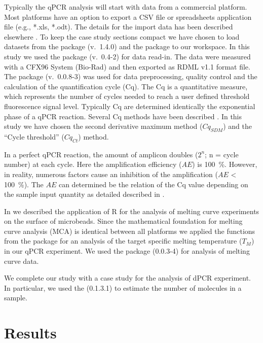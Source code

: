 Typically the qPCR analysis will start with data from a commercial platform. 
Most platforms have an option to export a CSV file or spreadsheets application 
file (e.g., *.xls, *.odt). The details for the import data has been described 
elsewhere \citep{RDCT2010c, rodiger_rkward_2012}. To keep the case study 
sections compact we have chosen to load datasets from the  package 
\citep{ritz_2008, spiess_2008} (v.~1.4.0) and the  package to our 
workspace. In this study we used the  package (v.~0.4-2) for data 
read-in. The data were measured with a CFX96 System (Bio-Rad) and then exported 
as RDML v1.1 format file. The  package (v.~0.0.8-3) was used 
for data preprocessing, quality control and  the calculation of the 
quantification cycle (Cq). The Cq is a quantitative measure, which represents 
the number of cycles needed to reach a user defined threshold fluorescence 
signal level. Typically Cq are determined identically the exponential phase of a 
qPCR reaction. Several Cq methods have been described \citep{ruijter_2013}. In 
this study we have chosen the second derivative maximum method ($Cq_{SDM}$) and 
the ``Cycle threshold'' ($Cq_{Ct}$) method.

In a perfect qPCR reaction, the amount of amplicon doubles ($2^{n}$; n = cycle 
number) at each cycle. Here the amplification efficiency ($AE$) is 100~\%. 
However, in reality, numerous factors cause an inhibition of the amplification 
($AE$ < 100~\%).  The $AE$ can determined be the relation of the Cq value 
depending on the sample input quantity as detailed described in 
\citep{roediger_chippcr_2014}.

In \citet{roediger_RJ_2013} we described the application of R for the analysis 
of melting curve experiments on the surface of microbeads. Since the 
mathematical foundation for melting curve analysis (MCA) is identical between 
all platforms we applied the functions from the  package 
\citep{roediger_RJ_2013} for an analysis of the target specific melting 
temperature ($T_{M}$) in our qPCR experiment. We used the  
package (0.0.3-4) for analysis of melting curve data.

We complete our study with a case study for the analysis of dPCR 
experiment. In particular, we used the  (0.1.3.1) to estimate the 
number of molecules in a sample.

\section{Results}


